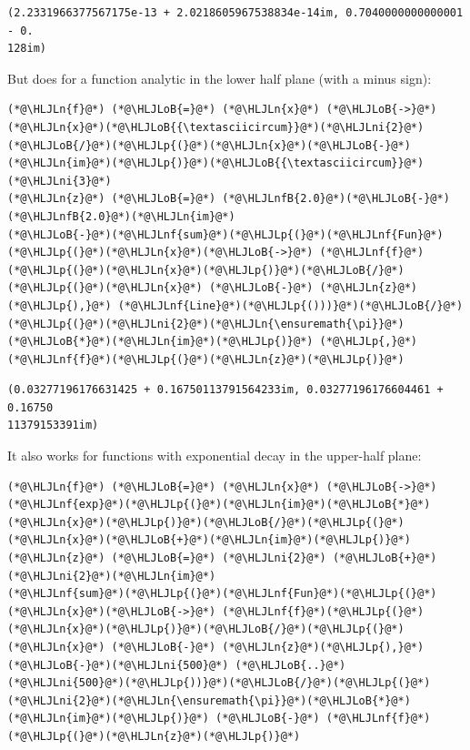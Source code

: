 \documentclass[12pt,a4paper]{article}
\newcommand{\HLJLn}[1]{#1}
\newcommand{\HLJLnf}[1]{\textcolor[RGB]{66,102,213}{#1}}
\newcommand{\HLJLnfB}[1]{\textcolor[RGB]{59,151,46}{#1}}
\newcommand{\HLJLni}[1]{\textcolor[RGB]{59,151,46}{#1}}
\newcommand{\HLJLoB}[1]{\textcolor[RGB]{102,102,102}{\textbf{#1}}}
\newcommand{\HLJLp}[1]{#1}
\begin{document}
\begin{lstlisting}
(2.2331966377567175e-13 + 2.0218605967538834e-14im, 0.7040000000000001 - 0.
128im)
\end{lstlisting}


But does for a function analytic in the lower half plane (with a minus sign):


\begin{lstlisting}
(*@\HLJLn{f}@*) (*@\HLJLoB{=}@*) (*@\HLJLn{x}@*) (*@\HLJLoB{->}@*) (*@\HLJLn{x}@*)(*@\HLJLoB{{\textasciicircum}}@*)(*@\HLJLni{2}@*)(*@\HLJLoB{/}@*)(*@\HLJLp{(}@*)(*@\HLJLn{x}@*)(*@\HLJLoB{-}@*)(*@\HLJLn{im}@*)(*@\HLJLp{)}@*)(*@\HLJLoB{{\textasciicircum}}@*)(*@\HLJLni{3}@*)
(*@\HLJLn{z}@*) (*@\HLJLoB{=}@*) (*@\HLJLnfB{2.0}@*)(*@\HLJLoB{-}@*)(*@\HLJLnfB{2.0}@*)(*@\HLJLn{im}@*)
(*@\HLJLoB{-}@*)(*@\HLJLnf{sum}@*)(*@\HLJLp{(}@*)(*@\HLJLnf{Fun}@*)(*@\HLJLp{(}@*)(*@\HLJLn{x}@*)(*@\HLJLoB{->}@*) (*@\HLJLnf{f}@*)(*@\HLJLp{(}@*)(*@\HLJLn{x}@*)(*@\HLJLp{)}@*)(*@\HLJLoB{/}@*)(*@\HLJLp{(}@*)(*@\HLJLn{x}@*) (*@\HLJLoB{-}@*) (*@\HLJLn{z}@*)(*@\HLJLp{),}@*) (*@\HLJLnf{Line}@*)(*@\HLJLp{()))}@*)(*@\HLJLoB{/}@*)(*@\HLJLp{(}@*)(*@\HLJLni{2}@*)(*@\HLJLn{\ensuremath{\pi}}@*)(*@\HLJLoB{*}@*)(*@\HLJLn{im}@*)(*@\HLJLp{)}@*) (*@\HLJLp{,}@*) (*@\HLJLnf{f}@*)(*@\HLJLp{(}@*)(*@\HLJLn{z}@*)(*@\HLJLp{)}@*)
\end{lstlisting}

\begin{lstlisting}
(0.03277196176631425 + 0.16750113791564233im, 0.03277196176604461 + 0.16750
11379153391im)
\end{lstlisting}


It also works for functions with exponential decay in the upper-half plane:


\begin{lstlisting}
(*@\HLJLn{f}@*) (*@\HLJLoB{=}@*) (*@\HLJLn{x}@*) (*@\HLJLoB{->}@*) (*@\HLJLnf{exp}@*)(*@\HLJLp{(}@*)(*@\HLJLn{im}@*)(*@\HLJLoB{*}@*)(*@\HLJLn{x}@*)(*@\HLJLp{)}@*)(*@\HLJLoB{/}@*)(*@\HLJLp{(}@*)(*@\HLJLn{x}@*)(*@\HLJLoB{+}@*)(*@\HLJLn{im}@*)(*@\HLJLp{)}@*)
(*@\HLJLn{z}@*) (*@\HLJLoB{=}@*) (*@\HLJLni{2}@*) (*@\HLJLoB{+}@*) (*@\HLJLni{2}@*)(*@\HLJLn{im}@*)
(*@\HLJLnf{sum}@*)(*@\HLJLp{(}@*)(*@\HLJLnf{Fun}@*)(*@\HLJLp{(}@*)(*@\HLJLn{x}@*)(*@\HLJLoB{->}@*) (*@\HLJLnf{f}@*)(*@\HLJLp{(}@*)(*@\HLJLn{x}@*)(*@\HLJLp{)}@*)(*@\HLJLoB{/}@*)(*@\HLJLp{(}@*)(*@\HLJLn{x}@*) (*@\HLJLoB{-}@*) (*@\HLJLn{z}@*)(*@\HLJLp{),}@*) (*@\HLJLoB{-}@*)(*@\HLJLni{500}@*) (*@\HLJLoB{..}@*) (*@\HLJLni{500}@*)(*@\HLJLp{))}@*)(*@\HLJLoB{/}@*)(*@\HLJLp{(}@*)(*@\HLJLni{2}@*)(*@\HLJLn{\ensuremath{\pi}}@*)(*@\HLJLoB{*}@*)(*@\HLJLn{im}@*)(*@\HLJLp{)}@*) (*@\HLJLoB{-}@*) (*@\HLJLnf{f}@*)(*@\HLJLp{(}@*)(*@\HLJLn{z}@*)(*@\HLJLp{)}@*)
\end{lstlisting}
\end{document}
